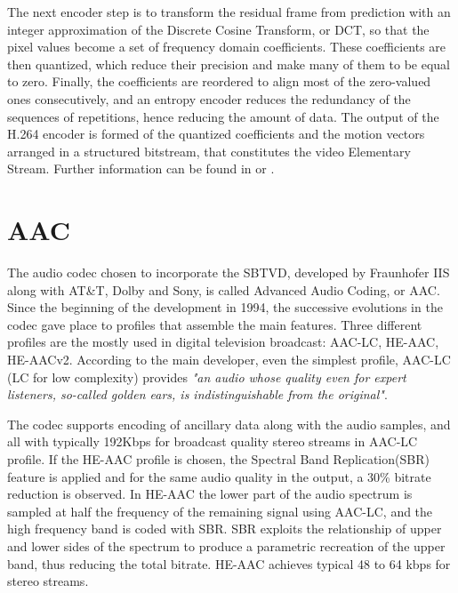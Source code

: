 \documentclass[
	12pt,				%
	openright,			%
	twoside,			%
	a4paper,			%
	brazil,
	french,				%
	english
	]{abntex2}
\begin{document}
The next encoder step is to transform the residual frame from prediction with an integer approximation of the Discrete Cosine Transform, or DCT, so that the pixel values become a set of frequency domain coefficients. These coefficients are then quantized, which reduce their precision and make many of them to be equal to zero. Finally, the coefficients are reordered to align most of the zero-valued ones consecutively, and an entropy encoder reduces the redundancy of the sequences of repetitions, hence reducing the amount of data. The output of the H.264 encoder is formed of the quantized coefficients and the motion vectors arranged in a structured bitstream, that constitutes the video Elementary Stream. Further information can be found in \cite{vcodex} or \cite{richardson}.

\section{AAC}

The audio codec chosen to incorporate the SBTVD, developed by Fraunhofer IIS along with AT\&T, Dolby and Sony, is called Advanced Audio Coding, or AAC. Since the beginning of the development in 1994, the successive evolutions in the codec gave place to profiles that assemble the main features. Three different profiles are the mostly used in digital television broadcast: AAC-LC, HE-AAC, HE-AACv2. According to the main developer\cite{fraunhofer}, even the simplest profile, AAC-LC (LC for low complexity) provides \textit{"an audio whose quality even for expert listeners, so-called golden ears, is indistinguishable from the original"}.

The codec supports encoding of ancillary data along with the audio samples, and all with typically 192Kbps for broadcast quality stereo streams in AAC-LC profile. If the HE-AAC profile is chosen, the Spectral Band Replication(SBR) feature is applied and for the same audio quality in the output, a 30\% bitrate reduction is observed. In HE-AAC the lower part of the audio spectrum is sampled at half the frequency of the remaining signal using AAC-LC, and the high frequency band is coded with SBR. SBR exploits the relationship of upper and lower sides of the spectrum to produce a parametric recreation of the upper band, thus reducing the total bitrate. HE-AAC achieves typical 48 to 64 kbps for stereo streams.
\end{document}
